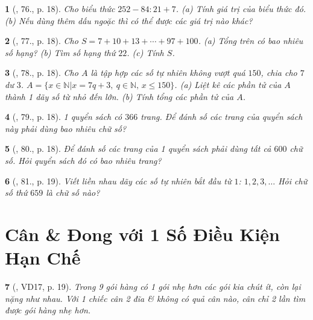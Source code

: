 \documentclass{article}
\newtheorem{baitoan}{}
\begin{document}
\begin{baitoan}[\cite{Tuyen_Toan_6}, 76., p. 18]
	Cho biểu thức $252 - 84:21 + 7$. (a) Tính giá trị của biểu thức đó. (b) Nếu dùng thêm dấu ngoặc thì có thể được các giá trị nào khác?
\end{baitoan}

\begin{baitoan}[\cite{Tuyen_Toan_6}, 77., p. 18]
	Cho $S = 7 + 10 + 13 + \cdots + 97 + 100$. (a) Tổng trên có bao nhiêu số hạng? (b) Tìm số hạng thứ $22$. (c) Tính $S$.
\end{baitoan}

\begin{baitoan}[\cite{Tuyen_Toan_6}, 78., p. 18]
	Cho $A$ là tập hợp các số tự nhiên không vượt quá $150$, chia cho $7$ dư $3$. $A = \{x\in\mathbb{N}|x = 7q + 3,\ q\in\mathbb{N},\,x\le150\}$. (a) Liệt kê các phần tử của $A$ thành 1 dãy số từ nhỏ đến lớn. (b) Tính tổng các phần tử của $A$.
\end{baitoan}

\begin{baitoan}[\cite{Tuyen_Toan_6}, 79., p. 18]
	1 quyển sách có $366$ trang. Để đánh số các trang của quyển sách này phải dùng bao nhiêu chữ số?
\end{baitoan}

\begin{baitoan}[\cite{Tuyen_Toan_6}, 80., p. 18]
	Để đánh số các trang của 1 quyển sách phải dùng tất cả $600$ chữ số. Hỏi quyển sách đó có bao nhiêu trang?
\end{baitoan}

\begin{baitoan}[\cite{Tuyen_Toan_6}, 81., p. 19]
	Viết liền nhau dãy các số tự nhiên bắt đầu từ $1$: $1,2,3,\ldots$ Hỏi chữ số thứ $659$ là chữ số nào?
\end{baitoan}


\section{Cân \& Đong với 1 Số Điều Kiện Hạn Chế}

\begin{baitoan}[\cite{Tuyen_Toan_6}, VD17, p. 19]
	Trong 9 gói hàng có 1 gói nhẹ hơn các gói kia chút ít, còn lại nặng như nhau. Với 1 chiếc cân 2 đĩa \& không có quả cân nào, cân chỉ 2 lần tìm được gói hàng nhẹ hơn.
\end{baitoan}
\end{document}
